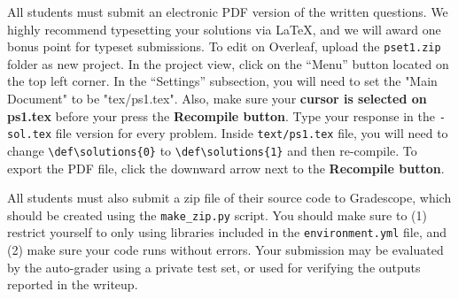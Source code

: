 
All students must submit an electronic PDF version of the written questions. We highly recommend typesetting your solutions via \LaTeX, and we will award one bonus point for typeset submissions. To edit on Overleaf, upload the \texttt{pset1.zip}  folder as new project. In the project view, click on the “Menu” button located on the top left corner. In the “Settings” subsection, you will need to set the "Main Document" to be "tex/ps1.tex". Also, make sure your \textbf{cursor is selected on ps1.tex}  before your press the \textbf{Recompile button}. Type your response in the \texttt{-sol.tex} file version for every problem. Inside \texttt{text/ps1.tex} file, you will need to change \texttt{\textbackslash def\textbackslash solutions\{0\}} to \texttt{\textbackslash def\textbackslash solutions\{1\}} and then re-compile. To export the PDF file, click the downward arrow next to the \textbf{Recompile button}.

\vspace{1mm}

All students must also submit a zip file of their source code to Gradescope, which should be created using the \texttt{make\_zip.py} script. You should make sure to (1) restrict yourself to only using libraries included in the \texttt{environment.yml} file, and (2) make sure your code runs without errors. Your submission may be evaluated by the auto-grader using a private test set, or used for verifying the outputs reported in the writeup. 


